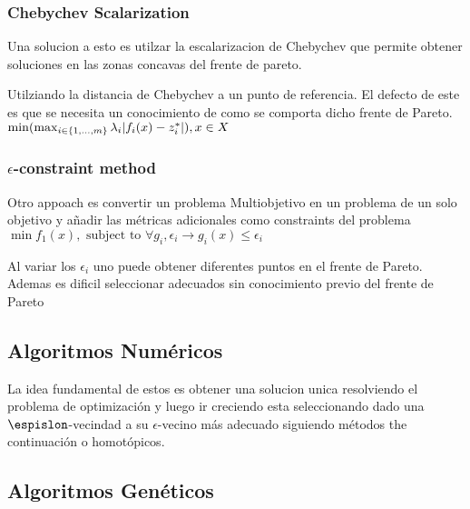 \subsubsection*{Chebychev Scalarization}

Una solucion a esto es utilzar la escalarizacion de Chebychev que permite obtener soluciones en las zonas concavas del frente de pareto.

Utilziando la distancia de Chebychev a un punto de referencia. El defecto de este es que se necesita un conocimiento de como se comporta dicho frente de Pareto. \\

\begin{math}
    \min  (\max_{i \in \{1,...,m\}}  \lambda_i|f_i(x) - z_i^*|), \space x \in X
\end{math}

\subsubsection*{$\epsilon$-constraint method}

Otro appoach es convertir un problema Multiobjetivo en un problema de un solo objetivo y añadir las m\'etricas adicionales como constraints del problema\\

\begin{math}
    \min f_1(x), \text{ subject to } \forall g_i, \epsilon_i  \rightarrow g_i(x) \leq \epsilon_i
\end{math}

Al variar los $\epsilon_i$ uno puede obtener diferentes puntos en el frente de Pareto. Ademas es dificil seleccionar \epislon adecuados sin conocimiento previo del frente de Pareto

\subsection*{Algoritmos Num\'ericos}

La idea fundamental de estos es obtener una solucion unica resolviendo el problema de optimizaci\'on y luego ir creciendo esta seleccionando dado una $\espislon$-vecindad a su $\epsilon$-vecino m\'as adecuado siguiendo m\'etodos the continuaci\'on o homot\'opicos.

\subsection*{Algoritmos Gen\'eticos}

